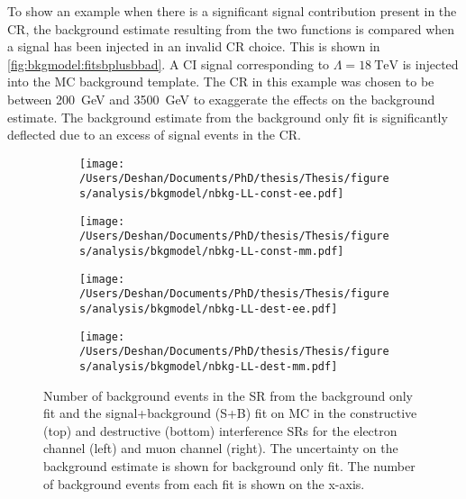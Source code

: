 To show an example when there is a significant signal contribution present in the CR, the background estimate resulting from the two functions is compared when a signal has been injected in an invalid CR choice. This is shown in \cref{fig:bkgmodel:fitsbplusbbad}. A CI signal corresponding to $\Lambda = \SI{18}{\tera\electronvolt}$ is injected into the MC background template. The CR in this example was chosen to be between \SI{200}{\giga\electronvolt} and \SI{3500}{\giga\electronvolt} to exaggerate the effects on the background estimate. The background estimate from the background only fit is significantly deflected due to an excess of signal events in the CR.

\begin{figure}[h!]
    \centering
    \begin{subfigure}[b]{0.49\textwidth}
        \centering
        \texttt{[image: /Users/Deshan/Documents/PhD/thesis/Thesis/figures/analysis/bkgmodel/nbkg-LL-const-ee.pdf]}
        \label{fig:bkgmodel:fitsbplusb1}
    \end{subfigure}
    \begin{subfigure}[b]{0.49\textwidth}
        \centering
        \texttt{[image: /Users/Deshan/Documents/PhD/thesis/Thesis/figures/analysis/bkgmodel/nbkg-LL-const-mm.pdf]}
        \label{fig:bkgmodel:fitsbplusb2}
    \end{subfigure}
    \begin{subfigure}[b]{0.49\textwidth}
        \centering
        \texttt{[image: /Users/Deshan/Documents/PhD/thesis/Thesis/figures/analysis/bkgmodel/nbkg-LL-dest-ee.pdf]}
        \label{fig:bkgmodel:fitsbplusb3}
    \end{subfigure}
    \begin{subfigure}[b]{0.49\textwidth}
        \centering
        \texttt{[image: /Users/Deshan/Documents/PhD/thesis/Thesis/figures/analysis/bkgmodel/nbkg-LL-dest-mm.pdf]}
        \label{fig:bkgmodel:fitsbplusb4}
    \end{subfigure}
    \caption[Background estimation comparisons of the signal+background fit and background only fit]{Number of background events in the SR from the background only fit and the signal+background (S+B) fit on MC in the constructive (top) and destructive (bottom) interference SRs for the electron channel (left) and muon channel (right). The uncertainty on the background estimate is shown for background only fit. The number of background events from each fit is shown on the x-axis.}
    \label{fig:bkgmodel:fitsbplusb}
\end{figure}

